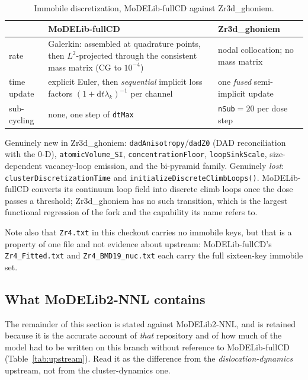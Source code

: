 \documentclass[11pt]{article}
\newcommand{\MoDfull}{\textsf{MoDELib-fullCD}}
\newcommand{\MoDnnl}{\textsf{MoDELib2-NNL}}
\newcommand{\Zrd}{\textsf{Zr3d\_ghoniem}}
\newcommand{\code}[1]{\texttt{\small #1}}
\newcommand{\file}[1]{\texttt{\footnotesize #1}}
\begin{document}
\begin{table}[htbp]
\centering
\caption{Immobile discretization, \MoDfull{} against \Zrd{}.}
\label{tab:fullcdvsours}
\begin{tabular}{@{}lp{}p{}@{}}
\toprule
 & \MoDfull{} & \Zrd{} \\
\midrule
rate & Galerkin: assembled at quadrature points, then $L^2$-projected through
       the consistent mass matrix (CG to $10^{-4}$) & nodal collocation; no
       mass matrix \\
time update & explicit Euler, then \emph{sequential} implicit loss factors
       $(1+\mathrm dt\lambda_k)^{-1}$ per channel & one \emph{fused}
       semi-implicit update \\
sub-cycling & none, one step of \code{dtMax} & \code{nSub}$=20$ per dose step \\
\bottomrule
\end{tabular}
\end{table}

\noindent
Genuinely new in \Zrd{}: \code{dadAnisotropy}/\code{dadZ0} (DAD reconciliation
with the 0-D), \code{atomicVolume\_SI}, \code{concentrationFloor},
\code{loopSinkScale}, size-dependent vacancy-loop emission, and the bi-pyramid
family. Genuinely \emph{lost}: \code{clusterDiscretizationTime} and
\code{initializeDiscreteClimbLoops()}. \MoDfull{} converts its continuum loop
field into discrete climb loops once the dose passes a threshold; \Zrd{} has no
such transition, which is the largest functional regression of the fork and the
capability its name refers to.

Note also that \file{Zr4.txt} in this checkout carries no immobile keys, but
that is a property of one file and not evidence about upstream: \MoDfull{}'s
\file{Zr4\_Fitted.txt} and \file{Zr4\_BMD19\_nuc.txt} each carry the full
sixteen-key immobile set.

\subsection{What \MoDnnl{} contains}

The remainder of this section is stated against \MoDnnl{}, and is retained
because it is the accurate account of \emph{that} repository and of how much of
the model had to be written on this branch without reference to \MoDfull{}
(Table~\ref{tab:upstream}). Read it as the difference from the
\emph{dislocation-dynamics} upstream, not from the cluster-dynamics one.
\end{document}
